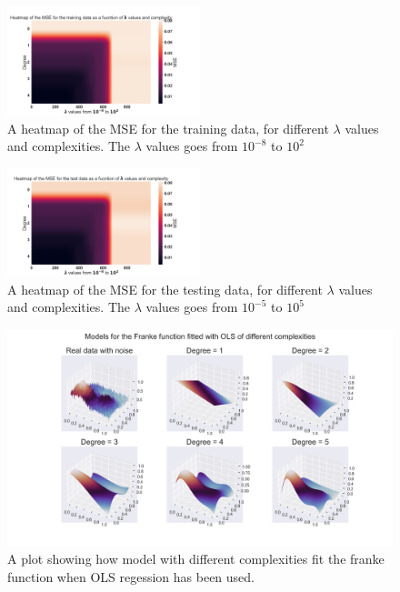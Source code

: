 \begin{figure}[H]
	\centering
	\includegraphics[width=0.5\textwidth]{Figure_9.png}
	\caption{A heatmap of the MSE for the training data, for different $\lambda$ values and complexities. The $\lambda$ values goes from $10^{-8}$ to $10^{2}$ }
	\label{heatmap training LASSO}
\end{figure}
\begin{figure}[h]
	\centering
	\includegraphics[width=0.5\textwidth]{Figure_10.png}
	\caption{A heatmap of the MSE for the testing data, for different $\lambda$ values and complexities. The $\lambda$ values goes from $10^{-5}$ to $10^{5}$}
	\label{heatmap test LASSO}
\end{figure}




\begin{figure}[h]
	\centering
	\includegraphics[width=\textwidth]{Figure_2.png}
	\caption{A plot showing how model with different complexities fit the franke function when OLS regession has been used.}
	\label{OLS figure}
\end{figure}


